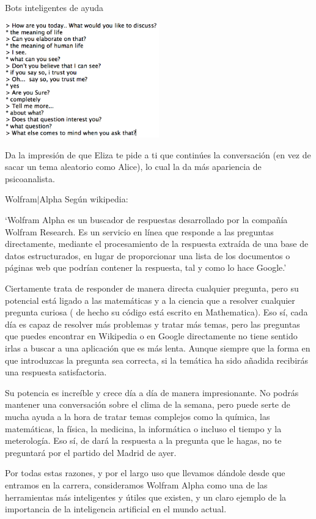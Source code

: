 \documentclass[spanish, a4paper, 12pt]{article} 	%
\begin{document}
\begin{section}{Bots inteligentes de ayuda}
\begin{itemize}
		\begin{center}
		\includegraphics[width=0.5\textwidth]{eliza.png}
		\end{center}	
	Da la impresión de que Eliza te pide a ti que continúes la conversación (en vez de sacar un tema aleatorio como Alice), lo cual la da más apariencia de psicoanalista.
	
	\newpage
\begin{section}{Wolfram$\vert$Alpha}
	Según wikipedia:
	
	`Wolfram Alpha  es un buscador de respuestas desarrollado por la compañía Wolfram Research. Es un servicio en línea que responde a las preguntas directamente, mediante el procesamiento de la respuesta extraída de una base de datos estructurados, en lugar de proporcionar una lista de los documentos o páginas web que podrían contener la respuesta, tal y como lo hace Google.'
	
	Ciertamente trata de responder de manera directa cualquier pregunta, pero su potencial está ligado a las matemáticas y a la ciencia que a resolver cualquier pregunta curiosa ( de hecho su código está escrito en Mathematica). Eso sí, cada día es capaz de resolver más problemas y tratar más temas, pero las preguntas que puedes encontrar en Wikipedia o en Google directamente no tiene sentido irlas a buscar a una aplicación que es más lenta.  Aunque siempre que la forma en que introduzcas la pregunta sea correcta, si la temática ha sido añadida recibirás una respuesta satisfactoria.
	
	  Su potencia es increíble y crece día a día de manera impresionante. No podrás mantener una conversación sobre el clima de la semana, pero puede serte de mucha ayuda a la hora de tratar temas complejos como la química, las matemáticas, la física, la medicina, la informática o incluso el tiempo y la meterología. Eso sí, de dará la respuesta a la pregunta que le hagas, no te preguntará por el partido del Madrid de ayer.
	
	Por todas estas razones, y por el largo uso que llevamos dándole desde que entramos en la carrera, consideramos Wolfram Alpha como una de las herramientas  más inteligentes y útiles que existen, y un claro ejemplo de la importancia de la inteligencia artificial en el mundo actual.
	

\end{section}
\end{itemize}
\end{section}
\end{document}
